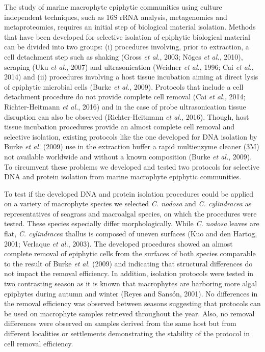 \documentclass[12pt,]{article}
\begin{document}
The study of marine macrophyte epiphytic communities using culture
independent techniques, such as 16S rRNA analysis, metagenomics and
metaproteomics, requires an initial step of biological material
isolation. Methods that have been developed for selective isolation of
epiphytic biological material can be divided into two groups: (i)
procedures involving, prior to extraction, a cell detachment step such
as shaking (Gross \emph{et al.}, 2003; Nõges \emph{et al.}, 2010),
scraping (Uku \emph{et al.}, 2007) and ultrasonication (Weidner \emph{et
al.}, 1996; Cai \emph{et al.}, 2014) and (ii) procedures involving a
host tissue incubation aiming at direct lysis of epiphytic microbial
cells (Burke \emph{et al.}, 2009). Protocols that include a cell
detachment procedure do not provide complete cell removal (Cai \emph{et
al.}, 2014; Richter-Heitmann \emph{et al.}, 2016) and in the case of
probe ultrasonication tissue disruption can also be observed
(Richter-Heitmann \emph{et al.}, 2016). Though, host tissue incubation
procedures provide an almost complete cell removal and selective
isolation, existing protocols like the one developed for DNA isolation
by Burke \emph{et al.} (2009) use in the extraction buffer a rapid
multienzyme cleaner (3M) not available worldwide and without a known
composition (Burke \emph{et al.}, 2009). To circumvent these problems we
developed and tested two protocols for selective DNA and protein
isolation from marine macrophyte epiphytic communities.

To test if the developed DNA and protein isolation procedures could be
applied on a variety of macrophyte species we selected \emph{C. nodosa}
and \emph{C. cylindracea} as representatives of seagrass and macroalgal
species, on which the procedures were tested. These species especially
differ morphologically. While \emph{C. nodosa} leaves are flat, \emph{C.
cylindracea} thallus is composed of uneven surfaces (Kuo and den Hartog,
2001; Verlaque \emph{et al.}, 2003). The developed procedures showed an
almost complete removal of epiphytic cells from the surfaces of both
species comparable to the result of Burke \emph{et al.} (2009) and
indicating that structural differences do not impact the removal
efficiency. In addition, isolation protocols were tested in two
contrasting season as it is known that macrophytes are harboring more
algal epiphytes during autumn and winter (Reyes and Sansón, 2001). No
differences in the removal efficiency was observed between seasons
suggesting that protocols can be used on macrophyte samples retrieved
throughout the year. Also, no removal differences were observed on
samples derived from the same host but from different localities or
settlements demonstrating the stability of the protocol in cell removal
efficiency.
\end{document}
